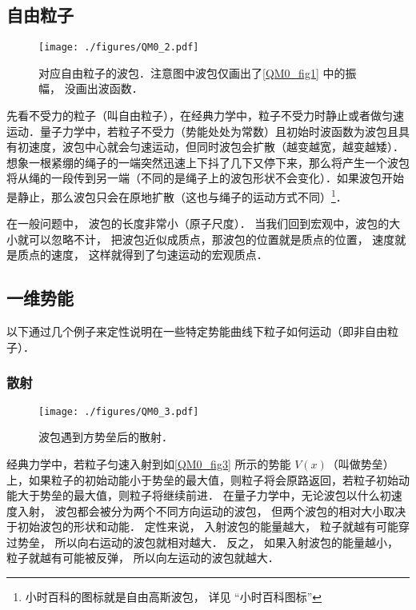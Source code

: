 \subsection{自由粒子}

\begin{figure}[ht]
\centering
\texttt{[image: ./figures/QM0\_2.pdf]}
\caption{对应自由粒子的波包．注意图中波包仅画出了\autoref{QM0_fig1} 中的振幅， 没画出波函数．} \label{QM0_fig2}
\end{figure}

先看不受力的粒子（叫自由粒子），在经典力学中，粒子不受力时静止或者做匀速运动．量子力学中，若粒子不受力（势能处处为常数）且初始时波函数为波包且具有初速度，波包中心就会匀速运动，但同时波包会扩散（越变越宽，越变越矮）．想象一根紧绷的绳子的一端突然迅速上下抖了几下又停下来，那么将产生一个波包将从绳的一段传到另一端（不同的是绳子上的波包形状不会变化）．如果波包开始是静止，那么波包只会在原地扩散（这也与绳子的运动方式不同）\footnote{小时百科的图标就是自由高斯波包， 详见 “小时百科图标”}．

在一般问题中， 波包的长度非常小（原子尺度）． 当我们回到宏观中，波包的大小就可以忽略不计， 把波包近似成质点，那波包的位置就是质点的位置， 速度就是质点的速度， 这样就得到了匀速运动的宏观质点．

\subsection{一维势能} 

以下通过几个例子来定性说明在一些特定势能曲线下粒子如何运动（即非自由粒子）．

\subsubsection{散射}

\begin{figure}[ht]
\centering
\texttt{[image: ./figures/QM0\_3.pdf]}
\caption{波包遇到方势垒后的散射．} \label{QM0_fig3} %
\end{figure}

经典力学中，若粒子匀速入射到如\autoref{QM0_fig3} 所示的势能 $V(x)$（叫做势垒）上，如果粒子的初始动能小于势垒的最大值，则粒子将会原路返回，若粒子初始动能大于势垒的最大值，则粒子将继续前进． 在量子力学中，无论波包以什么初速度入射， 波包都会被分为两个不同方向运动的波包， 但两个波包的相对大小取决于初始波包的形状和动能． 定性来说， 入射波包的能量越大， 粒子就越有可能穿过势垒， 所以向右运动的波包就相对越大． 反之， 如果入射波包的能量越小， 粒子就越有可能被反弹， 所以向左运动的波包就越大．

